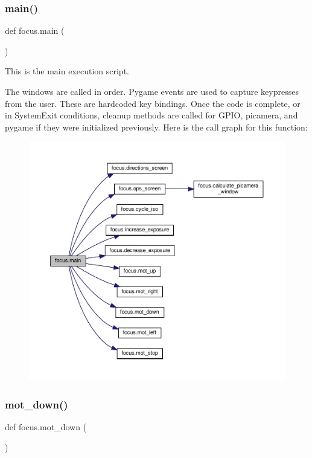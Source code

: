 \subsubsection{\texorpdfstring{main()}{main()}}
{\footnotesize\ttfamily def focus.\+main (\begin{DoxyParamCaption}{ }\end{DoxyParamCaption})}



This is the main execution script. 

The windows are called in order. Pygame events are used to capture keypresses from the user. These are hardcoded key bindings. Once the code is complete, or in System\+Exit conditions, cleanup methods are called for G\+P\+IO, picamera, and pygame if they were initialized previously. Here is the call graph for this function\+:\nopagebreak
\begin{figure}[H]
\begin{center}
\leavevmode
\includegraphics[width=350pt]{namespacefocus_a813bbce9c83fa23eae05039332cf3d8a_cgraph}
\end{center}
\end{figure}
\mbox{\label{namespacefocus_ab92c9c6869b0af6ce3a5920ef8554190}} 
\subsubsection{\texorpdfstring{mot\+\_\+down()}{mot\_down()}}
{\footnotesize\ttfamily def focus.\+mot\+\_\+down (\begin{DoxyParamCaption}{ }\end{DoxyParamCaption})}



